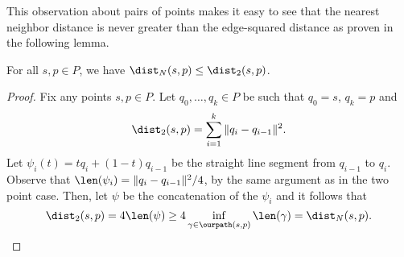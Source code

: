   This observation about pairs of points makes it easy to see that the nearest neighbor distance is never greater than the edge-squared distance as proven in the following lemma.

  \begin{lemma}\label{lem:dist_N_le_dist}
    For all $s,p\in P$, we have $\dist_N(s,p)\le \dist_2(s,p)$.
  \end{lemma}
  \begin{proof}
    Fix any points $s,p\in P$.
    Let $q_0,\ldots, q_k \in P$ be such that $q_0 = s$, $q_k = p$ and
    \[
      \dist_2(s,p) = \sum_{i=1}^k \|q_i - q_{i-1}\|^2.
    \]
    Let $\psi_i(t) = tq_i + (1-t)q_{i-1}$ be the straight line segment from $q_{i-1}$ to $q_i$.
    Observe that $\len(\psi_i) = \|q_i - q_{i-1}\|^2 / 4$, by the same argument as in the two point case.
    Then, let $\psi$ be the concatenation of the $\psi_i$ and it follows that
    \[
      \dist_2(s,p) = 4 \len(\psi) \ge 4 \inf_{\gamma\in \ourpath(s,p)} \len(\gamma) = \dist_N(s,p).\qedhere
    \]
  \end{proof}
  
